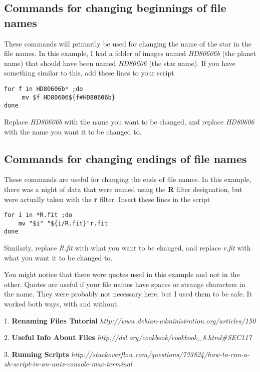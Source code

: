 \documentclass[10pt,preprint]{aastex}
\begin{document}
\subsection{Commands for changing beginnings of file names}
These commands will primarily be used for changing the name of the star in the file names.  In this example, I had a folder of images named \emph{HD80606b} (the planet name) that should have been named \emph{HD80606} (the star name).  If you have something similar to this, add these lines to your script

\begin{verbatim}
for f in HD80606b* ;do
     mv $f HD80606${f#HD80606b}
done
\end{verbatim}

Replace \emph{HD80606b} with the name you want to be changed, and replace \emph{HD80606} with the name you want it to be changed to.  

\subsection{Commands for changing endings of file names}
These commands are useful for changing the ends of file names.  In this example, there was a night of data that were named using the \textbf{R} filter designation, but were actually taken with the \textbf{r} filter.  Insert these lines in the script

\begin{verbatim}
for i in *R.fit ;do 
    mv "$i" "${i/R.fit}"r.fit
done
\end{verbatim}

Similarly, replace \emph{R.fit} with what you want to be changed, and replace \emph{r.fit} with what you want it to be changed to.  

You might notice that there were quotes used in this example and not in the other.  Quotes are useful if your file names have spaces or strange characters in the name.  They were probably not necessary here, but I used them to be safe.  It worked both ways, with and without.

\begin{thebibliography}{9}

  1. \textbf{Renaming Files Tutorial} \emph{http://www.debian-administration.org/articles/150}

  2. \textbf{Useful Info About Files} \emph{http://dsl.org/cookbook/cookbook\_{}8.html\#{}SEC117}

  3. \textbf{Running Scripts} \emph{http://stackoverflow.com/questions/733824/how-to-run-a-sh-script-in-an-unix-console-mac-terminal}

\end{thebibliography}
\end{document}
